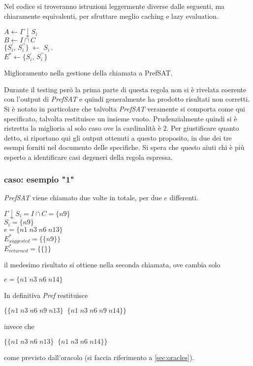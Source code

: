Nel codice si troveranno istruzioni leggermente diverse dalle seguenti, ma
chiaramente equivalenti, per sfruttare meglio caching e lazy evaluation.

\begin{algorithm}
	\SetAlgoLined
	$ A \leftarrow \Gamma\downarrow S_i$ \\
	$ B \leftarrow I\cap C$ \\
	 {
		$\{S_i^\prime,\,S_i^{\prime \prime}\} \;\leftarrow \; S_i$\,.\, \\
		$E^* \leftarrow  \{S_i^\prime,\,S_i^{\prime \prime}\}$
		} 
	\caption{Miglioramento nella gestione della chiamata a PrefSAT.}
\end{algorithm}	

Durante il testing però la prima parte di questa regola non si è rivelata coerente con
l'output di \emph{PrefSAT} e quindi generalmente ha prodotto risultati non
corretti. Si è notato in particolare che talvolta \emph{PrefSAT} veramente si 
comporta come qui specificato, talvolta restituisce un insieme vuoto.
Prudenzialmente quindi si è ristretta la miglioria al solo caso ove la
cardinalità è 2. Per giustificare quanto detto, si riportano qui gli output
ottenuti a questo proposito, in due dei tre esempi forniti nel documento delle specifiche.
Si spera che questo aiuti chi è più esperto a identificare casi degeneri della
regola espressa.

\subsubsection{caso: esempio "1"}
\emph{PrefSAT} viene chiamato due volte in totale, per due $e$ differenti.
\begin{center}
  	$ \Gamma\downarrow S_i = I \cap C = \{ n9 \}$ \\
  	$ S_i = \{ n9 \}$ \\
  	$ e = \{ n1\;n3\;n6\;n13 \}$ \\
  	$ E^*_{suggested} = \{ \{ n9 \} \}$ \\
  	$ E^*_{returned}  = \{ \{ \} \}$
\end{center}
il medesimo risultato si ottiene nella seconda chiamata, ove cambia solo 
\begin{center}
	$ e = \{n1\;n3\;n6\;n14\}$
\end{center}
In definitiva \emph{Pref} restituisce 
\begin{center}
	$\{\{n1\;n3\;n6\;n9\;n13\}\;\;\{n1\;n3\;n6\;n9 \;n14\}\}$ 
\end{center}
invece che
\begin{center} 
	$\{\{n1\;n3\;n6\;n13\}\;\;\{n1\;n3\;n6\;n14\}\}$
\end{center} come previsto dall'oracolo (si faccia riferimento a \ref{sec:oracles}).

